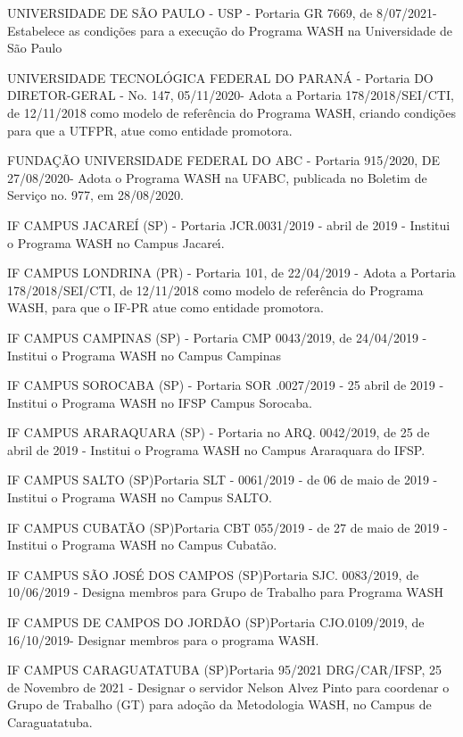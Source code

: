 \documentclass[
12pt,		%
openright,	%
twoside,  %
a4paper,			%
chapter=TITLE,		%
english,			%
french,				%
spanish,			%
brazil				%
]{USPSC-classe/USPSC}
\begin{document}
\begin{alineas}
\item UNIVERSIDADE DE S\~AO PAULO - USP - Portaria GR 7669, de 8/07/2021- Estabelece as condi\c{c}\~oes para a execu\c{c}\~ao do Programa WASH na Universidade de S\~ao Paulo
\item UNIVERSIDADE TECNOL\'OGICA FEDERAL DO PARAN\'A - Portaria DO DIRETOR-GERAL - No. 147, 05/11/2020- Adota a Portaria 178/2018/SEI/CTI, de 12/11/2018 como modelo de refer\^encia do Programa WASH, criando condi\c{c}\~oes para que a UTFPR, atue como entidade promotora.
\item FUNDA\c{C}\~AO UNIVERSIDADE FEDERAL DO ABC - Portaria 915/2020, DE 27/08/2020- Adota o Programa WASH na UFABC, publicada no Boletim de Servi\c{c}o no. 977, em 28/08/2020.
\item IF CAMPUS JACARE\'I (SP) - Portaria JCR.0031/2019 -  abril de 2019 - Institui o Programa WASH no Campus Jacare\'{\i}.
\item IF CAMPUS LONDRINA (PR) - Portaria 101, de 22/04/2019 - Adota a Portaria 178/2018/SEI/CTI, de 12/11/2018 como modelo de refer\^encia do Programa WASH, para que o IF-PR atue como entidade promotora.
\item IF CAMPUS CAMPINAS (SP) - Portaria CMP 0043/2019, de 24/04/2019 - Institui o Programa WASH no Campus Campinas
\item IF CAMPUS SOROCABA  (SP) - Portaria SOR .0027/2019 - 25 abril de 2019 - Institui o Programa WASH no IFSP Campus Sorocaba.
\item IF CAMPUS ARARAQUARA (SP) - Portaria no ARQ. 0042/2019, de 25 de abril de 2019 - Institui o Programa WASH no Campus Araraquara do IFSP.
\item IF CAMPUS SALTO (SP)Portaria SLT - 0061/2019 - de 06 de maio de 2019 - Institui o Programa WASH no Campus SALTO.
\item IF CAMPUS CUBAT\~AO (SP)Portaria CBT 055/2019 - de 27 de maio de 2019 - Institui o Programa WASH no Campus Cubat\~ao. 
\item IF CAMPUS S\~AO JOS\'E DOS CAMPOS (SP)Portaria  SJC. 0083/2019, de 10/06/2019 - Designa membros para Grupo de Trabalho para Programa WASH
\item IF CAMPUS DE CAMPOS DO JORD\~AO (SP)Portaria CJO.0109/2019, de 16/10/2019- Designar membros para o programa WASH. 
\item IF CAMPUS CARAGUATATUBA (SP)Portaria 95/2021 DRG/CAR/IFSP, 25 de Novembro de 2021 - Designar o servidor Nelson Alvez Pinto para coordenar o Grupo de Trabalho (GT) para ado\c{c}\~ao da Metodologia WASH, no Campus de Caraguatatuba. 
\end{alineas}
\end{document}
